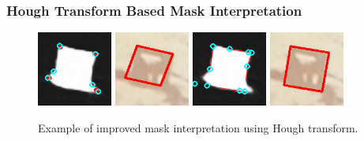 \documentclass[10pt]{book}
\begin{document}


\subsubsection{Hough Transform Based Mask Interpretation}

\begin{figure}
  \centering
     {\includegraphics[width=0.22\textwidth]{image/segpet_mask_2_pred_corners}}
     {\includegraphics[width=0.22\textwidth]{image/segpet_mask_2_pred_rect}}
     {\includegraphics[width=0.22\textwidth]{image/segpet_mask_2_pred_intersects}}
     {\includegraphics[width=0.22\textwidth]{image/segpet_mask_2_lines_pred_rect}}
  \caption{Example of improved mask interpretation using Hough transform.}
  \label{fig:segpet_lines_improvement}
\end{figure}
\end{document}
